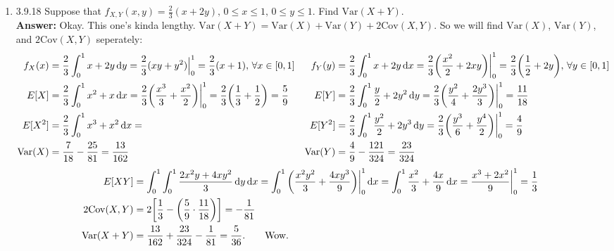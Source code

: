 \documentclass{article}
\begin{document}
\begin{enumerate}
        \item 3.9.18 Suppose that $f_{X,Y}(x,y) = \frac{2}{3}(x+2y), \, 0 \leq x \leq 1, \, 0 \leq y \leq 1$. Find $\mathrm{Var}(X+Y)$.\\
        \textbf{Answer: }Okay. This one's kinda lengthy. $\mathrm{Var}(X+Y) = \mathrm{Var}(X)+\mathrm{Var}(Y)+2\mathrm{Cov}(X,Y)$. So we will find $\mathrm{Var}(X)$, $\mathrm{Var}(Y)$, and $2\mathrm{Cov}(X,Y)$ seperately:
            \begin{align*}
                f_X(x) &= \frac{2}{3}\int_0^1 x+2y \dif y = \frac{2}{3}(xy+y^2)\Big|_0^1 = \frac{2}{3}(x+1), \, \forall x \in [0,1]     &      f_Y(y) &= \frac{2}{3}\int_0^1 x+2y \dif x = \frac{2}{3}\bigg(\frac{x^2}{2}+2xy\bigg)\bigg|_0^1 = \frac{2}{3}\bigg(\frac{1}{2}+2y\bigg), \, \forall y \in [0,1]\\
                E[X] &= \frac{2}{3} \int_0^1 x^2+x \dif x = \frac{2}{3}\bigg(\frac{x^3}{3}+\frac{x^2}{2}\bigg)\bigg|_0^1 = \frac{2}{3}\bigg(\frac{1}{3}+\frac{1}{2}\bigg) = \frac{5}{9}        &       E[Y] &= \frac{2}{3}\int_0^1 \frac{y}{2}+2y^2 \dif y = \frac{2}{3}\bigg(\frac{y^2}{4}+\frac{2y^3}{3}\bigg)\bigg|_0^1 = \frac{11}{18}\\
                E[X^2] &= \frac{2}{3} \int_0^1 x^3+x^2 \dif x =        &       E[Y^2] &= \frac{2}{3}\int_0^1 \frac{y^2}{2}+2y^3 \dif y = \frac{2}{3}\bigg(\frac{y^3}{6}+\frac{y^4}{2}\bigg)\bigg|_0^1 = \frac{4}{9}\\
                \mathrm{Var}(X) &= \frac{7}{18}-\frac{25}{81} = \frac{13}{162}      &       \mathrm{Var}(Y) &= \frac{4}{9}-\frac{121}{324} = \frac{23}{324}
            \end{align*}
            \begin{align*}
                E[XY] &= \int_0^1\int_0^1 \frac{2x^2y+4xy^2}{3} \dif y \dif x = \int_0^1 \bigg(\frac{x^2y^2}{3}+\frac{4xy^3}{9}\bigg)\bigg|_0^1 \dif x = \int_0^1 \frac{x^2}{3}+\frac{4x}{9} \dif x = \frac{x^3+2x^2}{9}\bigg|_0^1 = \frac{1}{3}\\
                2\mathrm{Cov}(X,Y) &= 2\bigg[\frac{1}{3}-\bigg(\frac{5}{9} \cdot \frac{11}{18}\bigg)\bigg] = -\frac{1}{81}\\
                \mathrm{Var}(X+Y) &= \frac{13}{162}+\frac{23}{324}-\frac{1}{81} = \frac{5}{36}. \qquad \text{Wow.} 
            \end{align*}
        

\end{enumerate}
\end{document}
